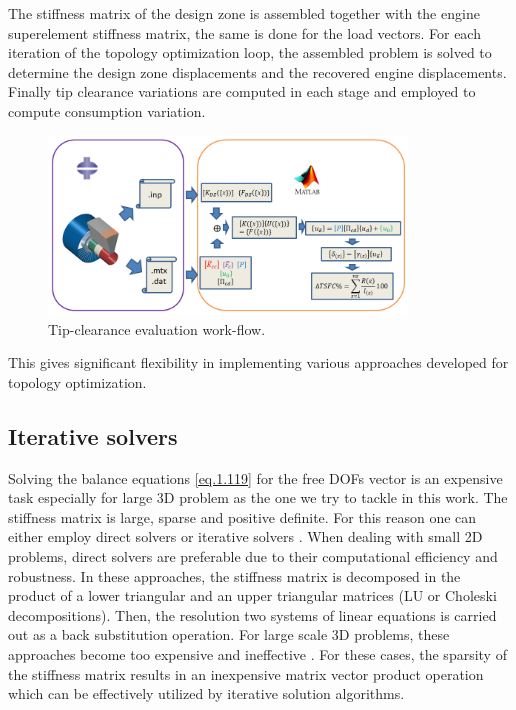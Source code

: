 The stiffness matrix of the design zone is assembled together with the engine superelement stiffness matrix, the same is done for the load vectors. For each iteration of the topology optimization loop, the assembled problem is solved to determine the design zone displacements and the recovered engine displacements.  Finally tip clearance variations are computed in each stage and employed to compute consumption variation.
\begin{figure}[hbt!]
\centering
\includegraphics[width=0.85\textwidth]{images/Ch1/tip_cl_wkf.png}
\caption{Tip-clearance evaluation work-flow. 
\label{f.6b}}
\end{figure}
 This gives significant flexibility in implementing various approaches developed for topology optimization.
\subsection{Iterative solvers}
\label{subsection1.4.2}
Solving the balance equations \eqref{eq.1.119} for the free DOFs vector is an expensive task especially for large 3D problem as the one we try to tackle in this work. The stiffness matrix is large, sparse and positive definite. For this reason one can either employ direct solvers \cite{davis2006direct} or
iterative solvers \cite{saad2003iterative}. When dealing with small 2D problems, direct solvers are preferable due to their computational efficiency and robustness. In these approaches, the stiffness matrix is decomposed in the product of a lower triangular and an upper triangular matrices (LU or Choleski decompositions). Then, the resolution two systems of linear equations is carried out as a back substitution operation. For large scale 3D problems, these approaches become too expensive and ineffective \cite{davis2006direct}. For these cases, the sparsity of the stiffness matrix results in an inexpensive matrix vector product operation which can be effectively utilized by iterative solution algorithms.
